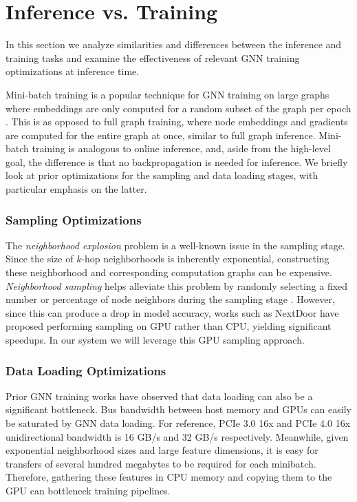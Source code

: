 \section{Inference vs. Training} \label{Background: Relation to training}
In this section we analyze similarities and differences between the inference and training tasks and examine the effectiveness of relevant GNN training optimizations at inference time.

Mini-batch training is a popular technique for GNN training on large graphs where embeddings are only computed for a random subset of the graph per epoch \cite{BGL_2023}. 
This is as opposed to full graph training, where node embeddings and gradients are computed for the entire graph at once, similar to full graph inference.
Mini-batch training is analogous to online inference, and, aside from the high-level goal, the difference is that no backpropagation is needed for inference. We briefly look at prior optimizations for the sampling and data loading stages, with particular emphasis on the latter.

\subsubsection{Sampling Optimizations}
The \textit{neighborhood explosion} problem is a well-known issue in the sampling stage.
Since the size of $k$-hop neighborhoods is inherently exponential, constructing these neighborhood and corresponding computation graphs can be expensive. \textit{Neighborhood sampling} helps alleviate this problem by randomly selecting a fixed number or percentage of node neighbors during the sampling stage \cite{GraphSAGE_2017}. 
However, since this can produce a drop in model accuracy, works such as NextDoor \cite{NextDoor_2021} have proposed performing sampling on GPU rather than CPU, yielding significant speedups.
In our system we will leverage this GPU sampling approach.

\subsubsection{Data Loading Optimizations}

Prior GNN training works have observed that data loading can also be a significant bottleneck.
Bus bandwidth between host memory and GPUs can easily be saturated by GNN data loading. 
For reference, PCIe 3.0 16x and PCIe 4.0 16x unidirectional bandwidth is 16 GB/s and 32 GB/s respectively.
Meanwhile, given exponential neighborhood sizes and large feature dimensions, it is easy for transfers of several hundred megabytes to be required for each minibatch.
Therefore, gathering these features in CPU memory and copying them to the GPU can bottleneck training pipelines.

